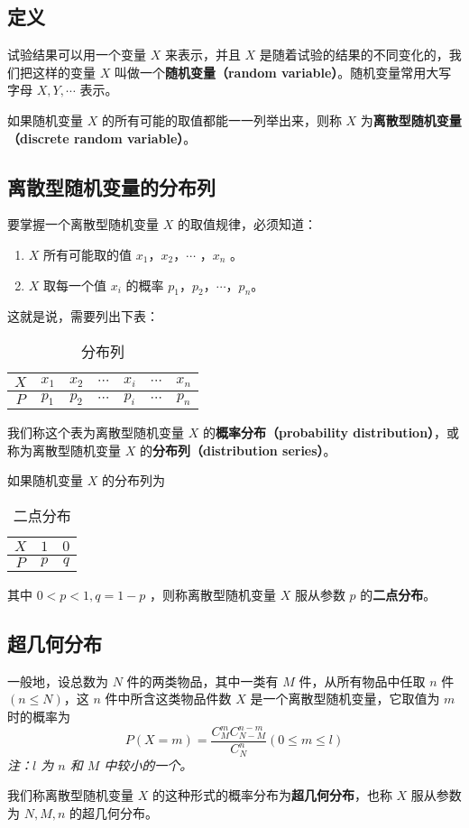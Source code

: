 

\subsection{定义}
试验结果可以用一个变量 $X$ 来表示，并且 $X$ 是随着试验的结果的不同变化的，我们把这样的变量 $X$ 叫做一个\textbf{随机变量（random variable）}。随机变量常用大写字母 $X,Y,\cdots$ 表示。

如果随机变量  $X$ 的所有可能的取值都能一一列举出来，则称 $X$ 为\textbf{离散型随机变量（discrete random variable）}。

\subsection{离散型随机变量的分布列}
要掌握一个离散型随机变量 $X$ 的取值规律，必须知道：
\begin{enumerate}
\item $X$ 所有可能取的值 $x_1$，$x_2$，$\cdots$ ，$x_n$ 。
\item $X$ 取每一个值 $x_i$ 的概率 $p_1$，$p_2$，$\cdots$，$p_n$。
\end{enumerate}
这就是说，需要列出下表：

\begin{table}[ht]
\centering
\caption{分布列}\label{tab_HsDRV_1}
\begin{tabular}{|c|c|c|c|c|c|c|}
\hline
$X$ & $x_1$ & $x_2$ & $\cdots$ & $x_i$ & $\cdots$ & $x_n$ \\
\hline
$P$ & $p_1$ & $p_2$ & $\cdots$ & $p_i$ & $\cdots$ & $p_n$ \\
\hline
\end{tabular}
\end{table}
我们称这个表为离散型随机变量 $X$ 的\textbf{概率分布（probability distribution）}，或称为离散型随机变量 $X$ 的\textbf{分布列（distribution series）}。

如果随机变量 $X$ 的分布列为

\begin{table}[ht]
\centering
\caption{二点分布}\label{tab_HsDRV_2}
\begin{tabular}{|c|c|c|}
\hline
$X$ & $1$ & $0$ \\
\hline
$P$ & $p$ & $q$ \\
\hline
\end{tabular}
\end{table}
其中 $0<p<1,q=1-p$ ，则称离散型随机变量 $X$ 服从参数 $p$ 的\textbf{二点分布}。

\subsection{超几何分布}
一般地，设总数为 $N$ 件的两类物品，其中一类有 $M$ 件，从所有物品中任取 $n$ 件 $(n\leqslant N)$，这 $n$ 件中所含这类物品件数 $X$ 是一个离散型随机变量，它取值为 $m$ 时的概率为
\begin{equation}
P(X=m) = \frac{C_M^mC_{N-M}^{n-m}}{C_N^n}(0\leqslant m\leqslant l)
\end{equation}
\textsl{注：$l$ 为 $n$ 和 $M$ 中较小的一个。}

我们称离散型随机变量 $X$ 的这种形式的概率分布为\textbf{超几何分布}，也称 $X$ 服从参数为 $N,M,n$ 的超几何分布。